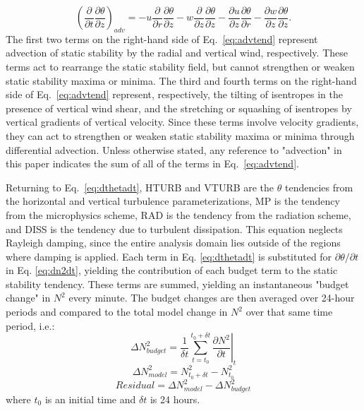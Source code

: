    \begin{equation} \label{eq:advtend}
   \left(\frac{\partial}{\partial t}\frac{\partial \theta}{\partial z}\right)_{adv} = -u\frac{\partial}{\partial r}\frac{\partial \theta}{\partial z}-w\frac{\partial}{\partial z}\frac{\partial \theta}{\partial z}-\frac{\partial u}{\partial z}\frac{\partial \theta}{\partial r}-\frac{\partial w}{\partial z}\frac{\partial \theta}{\partial z}.
   \end{equation}
The first two terms on the right-hand side of Eq.~\ref{eq:advtend} represent advection of static stability by the radial and vertical wind, respectively.
These terms act to rearrange the static stability field, but cannot strengthen or weaken static stability maxima or minima.
The third and fourth terms on the right-hand side of Eq.~\ref{eq:advtend} represent, respectively, the tilting of isentropes in the presence of vertical wind shear, and the stretching or squashing of isentropes by vertical gradients of vertical velocity.
Since these terms involve velocity gradients, they can act to strengthen or weaken static stability maxima or minima through differential advection.
Unless otherwise stated, any reference to "advection" in this paper indicates the sum of all of the terms in Eq.~\ref{eq:advtend}.

Returning to Eq.~\ref{eq:dthetadt}, HTURB and VTURB are the $\theta$ tendencies from the horizontal and vertical turbulence parameterizations, MP is the tendency from the microphysics scheme, RAD is the tendency from the radiation scheme, and DISS is the tendency due to turbulent dissipation.
This equation neglects Rayleigh damping, since the entire analysis domain lies outside of the regions where damping is applied.
Each term in Eq. \ref{eq:dthetadt} is substituted for ${\partial \theta}/{\partial t}$ in Eq. \ref{eq:dn2dt}, yielding the contribution of each budget term to the static stability tendency.
These terms are summed, yielding an instantaneous "budget change" in $N^2$ every minute.
The budget changes are then averaged over 24-hour periods and compared to the total model change in $N^2$ over that same time period, i.e.:
   \begin{equation} \label{eq:budgetchange}
   \Delta N^2_{budget} = \frac{1}{\delta t}\sum_{t=t_0}^{t_0+\delta t} \left.\frac{\partial N^2}{\partial t}\right\vert_t
   \end{equation}
   \begin{equation} \label{eq:modelchange}
   \Delta N^2_{model} = N^2_{t_0+\delta t}-N^2_{t_0}
   \end{equation}
   \begin{equation} \label{eq:residual}
   Residual = \Delta N^2_{model}-\Delta N^2_{budget}
   \end{equation}
where $t_0$ is an initial time and $\delta t$ is 24 hours.

